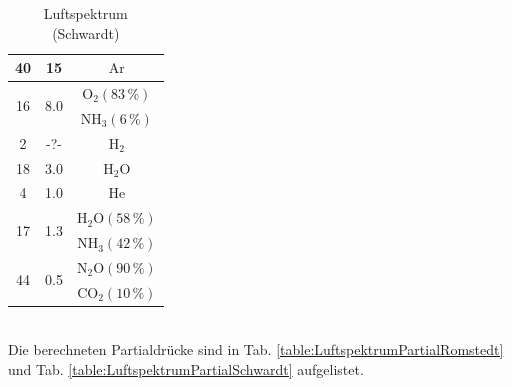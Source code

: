 \documentclass[german, parskip=full]{scrartcl}
\newcommand{\tecxt}{}
\begin{document}
\begin{table}[!htp]
\begin{minipage}{0.5\textwidth}
\begin{tabular}{c|c|c}
40&15&$\tecxt\text{Ar}$\\ \hline
\multirow{2}{*}{16}&\multirow{2}{*}{8.0}&$\tecxt\text{O}_2(83\,\%)$\\ 
&&$\tecxt\text{NH}_3(6\,\%)$\\ \hline
2&-?-&$\tecxt\text{H}_2$\\ \hline
18&3.0&$\tecxt\text{H}_2\tecxt\text{O}$\\ \hline
4&1.0&He\\ \hline
\multirow{2}{*}{17}&\multirow{2}{*}{1.3}&$\tecxt\text{H}_2\tecxt\text{O}(58\,\%)$\\ 
&&$\tecxt\text{NH}_3(42\,\%)$\\ \hline
\multirow{2}{*}{44}&\multirow{2}{*}{0.5}&$\tecxt\text{N}_2\tecxt\text{O}(90\,\%)$\\ 
&&$\tecxt\text{CO}_2(10\,\%)$\\
\end{tabular}
\caption{Luftspektrum (Schwardt)}
\label{table:LuftspektrumSchwardt}
\end{minipage}
\end{table}\\
Die berechneten Partialdrücke sind in Tab. \ref{table:LuftspektrumPartialRomstedt} und Tab. \ref{table:LuftspektrumPartialSchwardt} aufgelistet.
\end{document}
